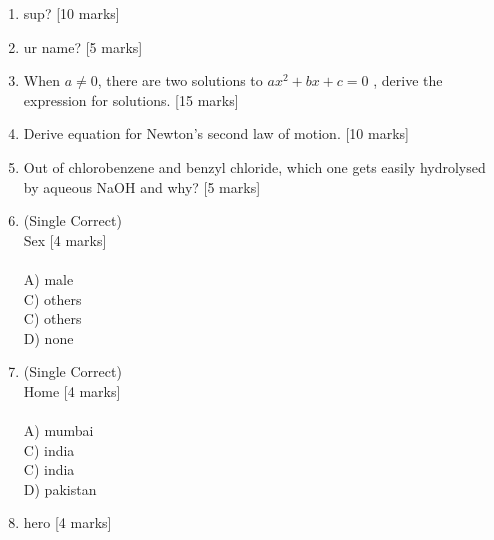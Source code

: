 \documentclass[12pt]{article}
\begin{document}
\begin{enumerate}
\item {\large sup?}
\hspace*{\fill} {\large [10 marks]}\vspace*{15.0cm}
\item {\large ur name?}
\hspace*{\fill} {\large [5 marks]}\vspace*{7.5cm}
\item {\large When $a \ne 0$, there are two solutions to \(ax^2 + bx + c = 0\) , derive the expression for solutions.}
\hspace*{\fill} {\large [15 marks]}\vspace*{22.5cm}
\item {\large Derive equation for Newton's second law of motion.}
\hspace*{\fill} {\large [10 marks]}\vspace*{15.0cm}
\item {\large Out of chlorobenzene and benzyl chloride, which one gets easily hydrolysed by aqueous NaOH and why?}
\hspace*{\fill} {\large [5 marks]}\vspace*{7.5cm}
\item {\large (Single Correct) \\ Sex
\hspace*{\fill} {\large [4 marks]}\\ 
\\ A) male\\ C) others\\ C) others\\ D) none}\vspace*{2cm}
\item {\large (Single Correct) \\ Home
\hspace*{\fill} {\large [4 marks]}\\ 
\\ A) mumbai\\ C) india\\ C) india\\ D) pakistan}\vspace*{3.5cm}
\item {\large hero}
\hspace*{\fill} {\large [4 marks]} \\ \\ 
\end{enumerate}
\end{document}
